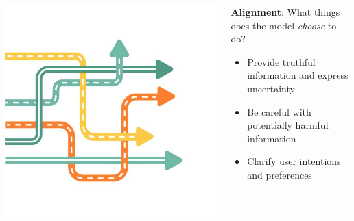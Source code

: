 \documentclass[usenames,dvipsnames,notes,11pt,aspectratio=169,hyperref={colorlinks=true, linkcolor=blue}]{beamer}
\begin{document}
\begin{frame}
        \begin{columns}
        \begin{column}{0.3\textwidth}
        \includegraphics[width=\textwidth]{figures/choice}
        \end{column}
        \begin{column}{0.7\textwidth}
    \textbf{Alignment}: What things does the model \emph{choose} to do?
    \begin{itemize}
        \item Provide truthful information and express uncertainty 
        \item Be careful with potentially harmful information  
        \item Clarify user intentions and preferences 
    \end{itemize}
        \end{column}
        \end{columns}
\end{frame}
\end{document}
